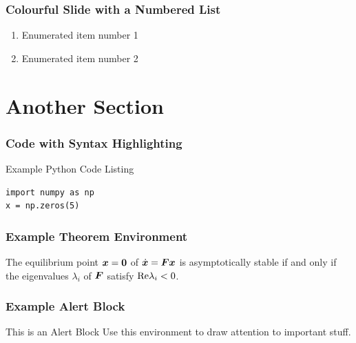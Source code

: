 \documentclass[fleqn]{qu-slides}
\begin{document}

\SlideThemeWhite
\begin{frame}
    \frametitle{Colourful Slide with a Numbered List}
    \begin{enumerate}
        \item Enumerated item number 1
        \item Enumerated item number 2
    \end{enumerate}
\end{frame}


\section{Another Section}

\SlideThemeGrey
\begin{frame}
    \flushleft
    {\bf\LARGE \insertsection}
\end{frame}


\SlideWhite
\begin{frame}[fragile]
    \frametitle{Code with Syntax Highlighting}
    \begin{block}{Example Python Code Listing}
    \begin{verbatim}
import numpy as np
x = np.zeros(5)
    \end{verbatim}
    \end{block}
\end{frame}


\SlideWhite
\begin{frame}[fragile]
    \frametitle{Example Theorem Environment}
    \begin{thm}
        The equilibrium point $\bm{x}=\bm{0}$ of $\dot{\bm{x}}=\bm{Fx}$ is asymptotically stable if and only if the eigenvalues $\lambda_{i}$ of $\bm{F}$ satisfy $\textup{Re}\lambda_{i}<0$.
    \end{thm}
\end{frame}


\SlideWhite
\begin{frame}[fragile]
    \frametitle{Example Alert Block}
    \begin{alertblock}{This is an Alert Block}
        Use this environment to draw attention to important stuff.
    \end{alertblock}
\end{frame}
\end{document}
